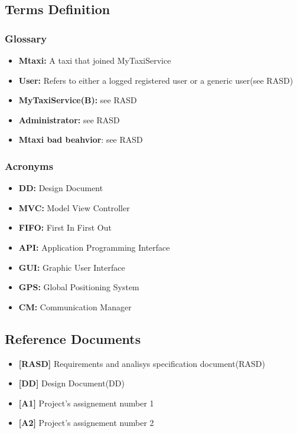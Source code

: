 \documentclass[11pt,titlepage]{article} %
\begin{document}
\subsection{Terms Definition}
  \subsubsection{Glossary}
    \begin{itemize}
      \item \textbf{Mtaxi:} A taxi that joined MyTaxiService
      \item \textbf{User:} Refers to either a logged registered user or a generic user(see RASD)
      \item \textbf{MyTaxiService(B):} see RASD
      \item \textbf{Administrator:} see RASD
      \item \textbf{Mtaxi bad beahvior}: see RASD
    \end{itemize}
   
  \subsubsection{Acronyms}
    \begin{itemize}
      \item \textbf{DD:} Design Document
      \item \textbf{MVC:} Model View Controller
      \item \textbf{FIFO:} First In First Out
      \item \textbf{API:} Application Programming Interface
      \item \textbf{GUI:} Graphic User Interface
      \item \textbf{GPS:} Global Positioning System
      \item \textbf{CM:} Communication Manager
     \end{itemize}

\subsection{Reference Documents}
  \begin{itemize}
   \item \textbf{[RASD]} Requirements and analisys specification document(RASD)
   \item \textbf{[DD]} Design Document(DD)
   \item \textbf{[A1]} Project's assignement number 1
   \item \textbf{[A2]} Project's assignement number 2
  \end{itemize}
\end{document}

